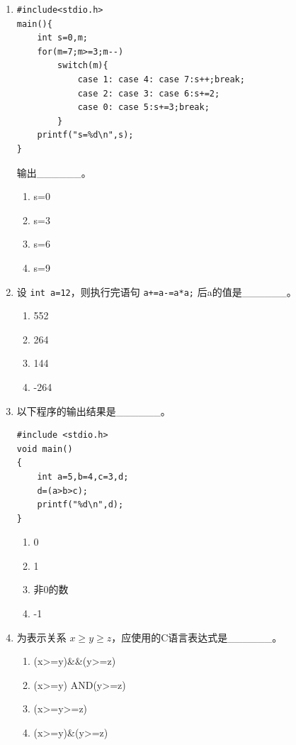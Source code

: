\documentclass[a4paper,12pt]{article}
\begin{document}
\begin{enumerate}
	\item
	      \begin{verbatim}
#include<stdio.h>
main(){
    int s=0,m;
    for(m=7;m>=3;m--)
        switch(m){
            case 1: case 4: case 7:s++;break;
            case 2: case 3: case 6:s+=2;
            case 0: case 5:s+=3;break;
        }
    printf("s=%d\n",s);
}
    \end{verbatim}
	      输出\_\_\_\_\_\_。
	      \begin{enumerate}
		      \item[A)] s=0
		      \item[B)] s=3
		      \item[C)] s=6
		      \item[D)] s=9
	      \end{enumerate}
	      \vspace{0.3cm}

	\item 设 \texttt{int a=12}，则执行完语句 \texttt{a+=a-=a*a;} 后a的值是\_\_\_\_\_\_。
	      \begin{enumerate}
		      \item[A)] 552
		      \item[B)] 264
		      \item[C)] 144
		      \item[D)] -264
	      \end{enumerate}
	      \vspace{0.3cm}

	\item 以下程序的输出结果是\_\_\_\_\_\_。
	      \begin{verbatim}
#include <stdio.h>
void main()
{
    int a=5,b=4,c=3,d;
    d=(a>b>c);
    printf("%d\n",d);
}
    \end{verbatim}
	      \begin{enumerate}
		      \item[A)] 0
		      \item[B)] 1
		      \item[C)] 非0的数
		      \item[D)] -1
	      \end{enumerate}
	      \vspace{0.3cm}

	\item 为表示关系 $x \ge y \ge z$，应使用的C语言表达式是\_\_\_\_\_\_。
	      \begin{enumerate}
		      \item[A)] (x>=y)\&\&(y>=z)
		      \item[B)] (x>=y) AND(y>=z)
		      \item[C)] (x>=y>=z)
		      \item[D)] (x>=y)\&(y>=z)
	      \end{enumerate}
	      \vspace{0.3cm}


\end{enumerate}
\end{document}
